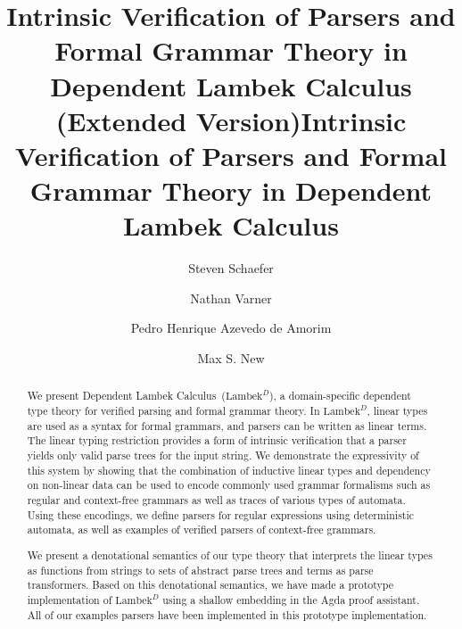 \documentclass[acmsmall,nonacm]{acmart}
\newcommand{\theoryname}{Dependent Lambek Calculus\xspace}
\newcommand{\theoryabbv}{$\textrm{Lambek}^D$\xspace}
\begin{document}
\pagebreak

\ifarxiv
\title{Intrinsic Verification of Parsers and Formal Grammar Theory in Dependent
  Lambek Calculus (Extended Version)}
\else
\title{Intrinsic Verification of Parsers and Formal Grammar Theory in Dependent Lambek Calculus}
\fi

\author{Steven Schaefer}

\author{Nathan Varner}

\author{Pedro Henrique Azevedo de Amorim}

\author{Max S. New}

\makeatletter
\let\@authorsaddresses\@empty
\makeatother

\begin{abstract}
  We present \theoryname~(\theoryabbv), a domain-specific dependent
  type theory for verified parsing and formal grammar theory. In
  \theoryabbv, linear types are used as a syntax for formal grammars,
  and parsers can be written as linear terms. The linear typing
  restriction provides a form of intrinsic verification that a parser
  yields only valid parse trees for the input string. We demonstrate
  the expressivity of this system by showing that the combination of
  inductive linear types and dependency on non-linear data can be used
  to encode commonly used grammar formalisms such as regular and
  context-free grammars as well as traces of various types of
  automata. Using these encodings, we define parsers for regular
  expressions using deterministic automata, as well as
  examples of verified parsers of context-free grammars.

  We present a denotational semantics of our type theory that interprets the
  linear types as functions from strings to sets of abstract parse trees and
  terms as parse transformers. Based on this denotational semantics, we have
  made a prototype implementation of \theoryabbv using a shallow embedding in
  the Agda proof assistant. All of our examples parsers have been implemented in
  this prototype implementation.
\end{abstract}
\end{document}
